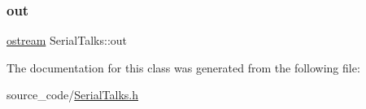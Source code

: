 \mbox{\label{class_serial_talks_adcce1950be020551b2acfac6c912bbb8}} 
\subsubsection{\texorpdfstring{out}{out}}
{\footnotesize\ttfamily \hyperlink{classostream}{ostream} Serial\+Talks\+::out}



The documentation for this class was generated from the following file\+:\begin{DoxyCompactItemize}
\item 
source\+\_\+code/\hyperlink{_serial_talks_8h}{Serial\+Talks.\+h}\end{DoxyCompactItemize}
